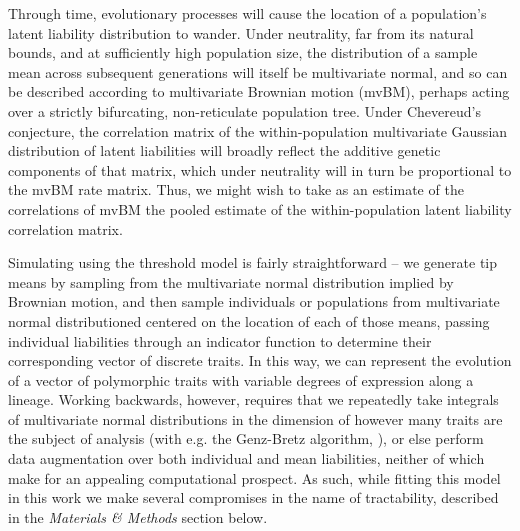 \documentclass[12pt, twocolumn, twoside]{article}
\begin{document}
Through time, evolutionary processes will cause the location of a population's latent liability distribution to wander. Under neutrality, far from its natural bounds, and at sufficiently high population size, the distribution of a sample mean across subsequent generations will itself be multivariate normal, and so can be described according to multivariate Brownian motion (mvBM), perhaps acting over a strictly bifurcating, non-reticulate population tree. Under Chevereud's conjecture, the correlation matrix of the within-population multivariate Gaussian distribution of latent liabilities will broadly reflect the additive genetic components of that matrix, which under neutrality will in turn be proportional to the mvBM rate matrix. Thus, we might wish to take as an estimate of the correlations of mvBM the pooled estimate of the within-population latent liability correlation matrix.

Simulating using the threshold model is fairly straightforward – we generate tip means by sampling from the multivariate normal distribution implied by Brownian motion, and then sample individuals or populations from multivariate normal distributioned centered on the location of each of those means, passing individual liabilities through an indicator function to determine their corresponding vector of discrete traits. In this way, we can represent the evolution of a vector of polymorphic traits with variable degrees of expression along a lineage. Working backwards, however, requires that we repeatedly take integrals of multivariate normal distributions in the dimension of however many traits are the subject of analysis (with e.g. the Genz-Bretz algorithm, \citealt{genzComparisonMethodsComputation2002}), or else perform data augmentation over both individual and mean liabilities, neither of which make for an appealing computational prospect. As such, while fitting this model in this work we make several compromises in the name of tractability, described in the \textit{Materials \& Methods} section below.  

\end{document}
